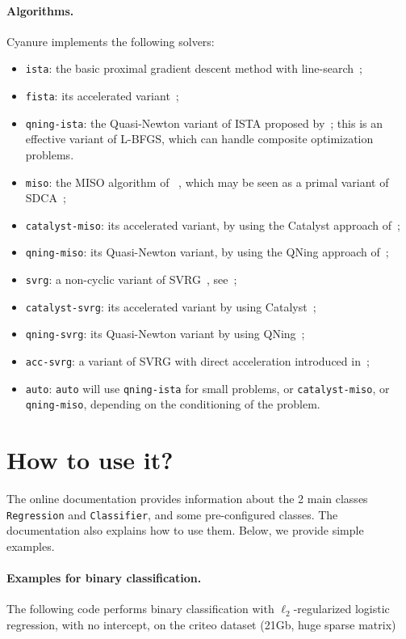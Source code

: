 \documentclass{article}
\begin{document}
\paragraph{Algorithms.}
Cyanure implements the following solvers:
\begin{itemize}
   \item \texttt{ista}: the basic proximal gradient descent method with line-search~\citep[see][]{fista};
   \item \texttt{fista}: its accelerated variant~\citep{fista};
   \item \texttt{qning-ista}: the Quasi-Newton variant of ISTA proposed by~\citet{lin2019inexact}; this is an effective variant of L-BFGS, which can handle composite optimization problems.
   \item \texttt{miso}: the MISO algorithm of ~\citet{miso}, which may be seen as a primal variant of SDCA~\citep{sdca};
   \item \texttt{catalyst-miso}: its accelerated variant, by using the Catalyst approach of~\citet{lin2018catalyst};
   \item \texttt{qning-miso}: its Quasi-Newton variant, by using the QNing approach of~\citet{lin2019inexact};
   \item \texttt{svrg}: a non-cyclic variant of SVRG~\citep{proxsvrg}, see~\citep{kulunchakov2019estimate};
   \item \texttt{catalyst-svrg}: its accelerated variant by using Catalyst~\citep{lin2018catalyst};
   \item \texttt{qning-svrg}: its Quasi-Newton variant by using QNing~\citep{lin2019inexact};
   \item \texttt{acc-svrg}: a variant of SVRG with direct acceleration introduced in~\citep{kulunchakov2019estimate};
   \item \texttt{auto}: \texttt{auto} will use \texttt{qning-ista} for small problems, or \texttt{catalyst-miso}, or \texttt{qning-miso}, depending on the conditioning of the problem.
\end{itemize}

\section{How to use it?}
The online documentation provides information about the 2 main classes \texttt{Regression} and \texttt{Classifier}, and some pre-configured classes. The documentation also explains how to use
them. Below, we provide simple examples.
\paragraph{Examples for binary classification.}
The following code performs binary classification with $\ell_2$-regularized logistic regression, with no intercept, on the criteo dataset (21Gb, huge sparse matrix)
\end{document}
